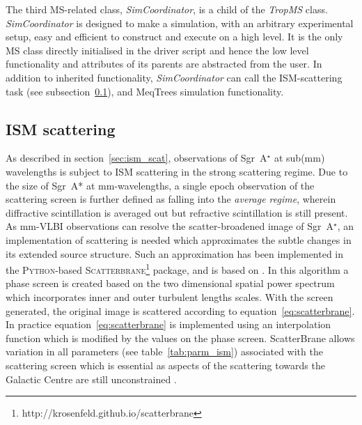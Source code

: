 The third MS-related class, \emph{SimCoordinator}, is a child of the {\it TropMS} class. {\it SimCoordinator} is designed to make a simulation, with an arbitrary experimental setup, easy and efficient to construct and execute on a high level. It is the only MS class directly initialised in the driver script and hence the low level functionality and attributes of its parents are abstracted from the user. In addition to inherited functionality, {\it SimCoordinator} can call the ISM-scattering task (see subsection~\ref{sec:ism_imp}), and {\sc MeqTrees} simulation functionality.
 

\subsection{ISM scattering}\label{sec:ism_imp}

As described in section~\ref{sec:ism_scat}, observations of Sgr~A$^\star$ at sub(mm) wavelengths is subject to ISM scattering in the strong scattering regime. Due to the size of Sgr~A* at mm-wavelengths, a single epoch observation of the scattering screen is further defined as falling into the \emph{average regime}, wherein diffractive scintillation is averaged out but refractive scintillation is still present. As mm-VLBI observations can resolve the scatter-broadened image of Sgr~A$^\star$, an implementation of scattering is needed which approximates the subtle changes in its extended source structure. Such an approximation has been implemented in the \textsc{Python}-based \textsc{Scatterbrane}\footnote{http://krosenfeld.github.io/scatterbrane} package, and is based on \citet*{Johnson_2015a}. In this algorithm a phase screen is created based on the two dimensional spatial power spectrum  \citep*[see][Appendix C]{Johnson_2015a} which incorporates inner and outer turbulent lengths scales. With the screen generated, the original image is scattered according to equation~\ref{eq:scatterbrane}. In practice equation~\ref{eq:scatterbrane} is implemented using an interpolation function which is modified by the values on the phase screen. {\sc ScatterBrane} allows variation in all parameters (see table~\ref{tab:parm_ism}) associated with the scattering screen which is essential as aspects of the scattering towards the Galactic Centre are still unconstrained \citep[e.g.][]{Gwinn_2014}.

